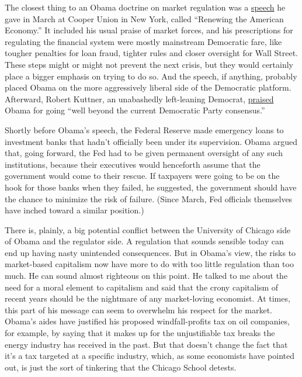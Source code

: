 The closest thing to an Obama doctrine on market regulation was a
\href{http://www.nytimes.com/2008/03/27/us/politics/27text-obama.html?pagewanted=print}{speech}
he gave in March at Cooper Union in New York, called ``Renewing the
American Economy.'' It included his usual praise of market forces, and
his prescriptions for regulating the financial system were mostly
mainstream Democratic fare, like tougher penalties for loan fraud,
tighter rules and closer oversight for Wall Street. These steps might or
might not prevent the next crisis, but they would certainly place a
bigger emphasis on trying to do so. And the speech, if anything,
probably placed Obama on the more aggressively liberal side of the
Democratic platform. Afterward, Robert Kuttner, an unabashedly
left-leaning Democrat,
\href{http://www.prospect.org/cs/articles?article=obama_v_krugman}{praised}
Obama for going ``well beyond the current Democratic Party consensus.''

Shortly before Obama's speech, the Federal Reserve made emergency loans
to investment banks that hadn't officially been under its supervision.
Obama argued that, going forward, the Fed had to be given permanent
oversight of any such institutions, because their executives would
henceforth assume that the government would come to their rescue. If
taxpayers were going to be on the hook for those banks when they failed,
he suggested, the government should have the chance to minimize the risk
of failure. (Since March, Fed officials themselves have inched toward a
similar position.)

There is, plainly, a big potential conflict between the University of
Chicago side of Obama and the regulator side. A regulation that sounds
sensible today can end up having nasty unintended consequences. But in
Obama's view, the risks to market-based capitalism now have more to do
with too little regulation than too much. He can sound almost righteous
on this point. He talked to me about the need for a moral element to
capitalism and said that the crony capitalism of recent years should be
the nightmare of any market-loving economist. At times, this part of his
message can seem to overwhelm his respect for the market. Obama's aides
have justified his proposed windfall-profits tax on oil companies, for
example, by saying that it makes up for the unjustifiable tax breaks the
energy industry has received in the past. But that doesn't change the
fact that it's a tax targeted at a specific industry, which, as some
economists have pointed out, is just the sort of tinkering that the
Chicago School detests.

